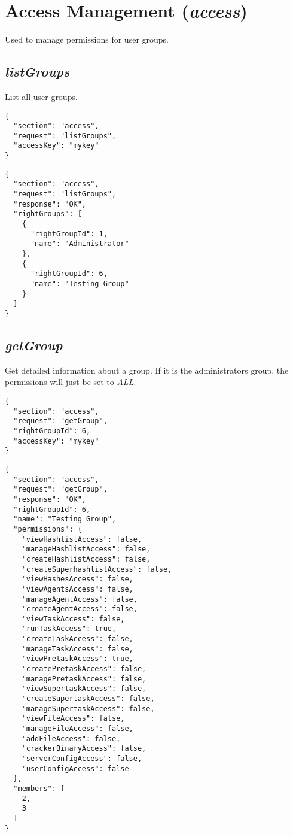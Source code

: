 \section*{Access Management (\textit{access})}
	Used to manage permissions for user groups.

\subsection*{\textit{listGroups}}
	List all user groups.
	{
		\color{blue}
		\begin{verbatim}
{
  "section": "access",
  "request": "listGroups",
  "accessKey": "mykey"
}
		\end{verbatim}
	}
	{
		\color{OliveGreen}
		\begin{verbatim}
{
  "section": "access",
  "request": "listGroups",
  "response": "OK",
  "rightGroups": [
    {
      "rightGroupId": 1,
      "name": "Administrator"
    },
    {
      "rightGroupId": 6,
      "name": "Testing Group"
    }
  ]
}
		\end{verbatim}
	}
\subsection*{\textit{getGroup}}
	Get detailed information about a group. If it is the administrators group, the permissions will just be set to \textit{ALL}.
	{
		\color{blue}
		\begin{verbatim}
{
  "section": "access",
  "request": "getGroup",
  "rightGroupId": 6,
  "accessKey": "mykey"
}
		\end{verbatim}
	}
	{
		\color{OliveGreen}
		\begin{verbatim}
{
  "section": "access",
  "request": "getGroup",
  "response": "OK",
  "rightGroupId": 6,
  "name": "Testing Group",
  "permissions": {
    "viewHashlistAccess": false,
    "manageHashlistAccess": false,
    "createHashlistAccess": false,
    "createSuperhashlistAccess": false,
    "viewHashesAccess": false,
    "viewAgentsAccess": false,
    "manageAgentAccess": false,
    "createAgentAccess": false,
    "viewTaskAccess": false,
    "runTaskAccess": true,
    "createTaskAccess": false,
    "manageTaskAccess": false,
    "viewPretaskAccess": true,
    "createPretaskAccess": false,
    "managePretaskAccess": false,
    "viewSupertaskAccess": false,
    "createSupertaskAccess": false,
    "manageSupertaskAccess": false,
    "viewFileAccess": false,
    "manageFileAccess": false,
    "addFileAccess": false,
    "crackerBinaryAccess": false,
    "serverConfigAccess": false,
    "userConfigAccess": false
  },
  "members": [
    2,
    3
  ]
}
		\end{verbatim}
	}
